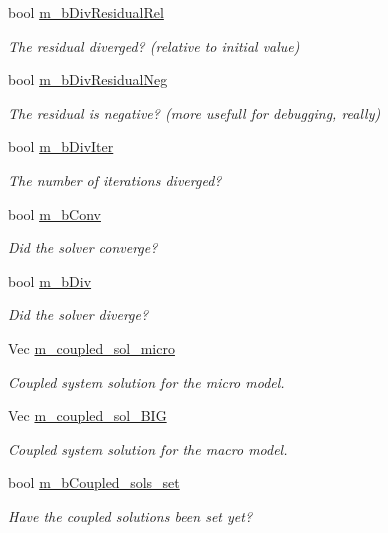 \begin{DoxyCompactItemize}
bool \hyperlink{classcarl_1_1_f_e_t_i___operations_a458f022e3ad766fadeab7746ef60f117}{m\+\_\+b\+Div\+Residual\+Rel}
\begin{DoxyCompactList}\small\item\em The residual diverged? (relative to initial value) \end{DoxyCompactList}\item 
bool \hyperlink{classcarl_1_1_f_e_t_i___operations_a343191e25b52e6913b686039fb5bd318}{m\+\_\+b\+Div\+Residual\+Neg}
\begin{DoxyCompactList}\small\item\em The residual is negative? (more usefull for debugging, really) \end{DoxyCompactList}\item 
bool \hyperlink{classcarl_1_1_f_e_t_i___operations_a7b94d72a58cd40af15151c28147ceb96}{m\+\_\+b\+Div\+Iter}
\begin{DoxyCompactList}\small\item\em The number of iterations diverged? \end{DoxyCompactList}\item 
bool \hyperlink{classcarl_1_1_f_e_t_i___operations_a4e8e38670cc41dc8de9e9465eda687ba}{m\+\_\+b\+Conv}
\begin{DoxyCompactList}\small\item\em Did the solver converge? \end{DoxyCompactList}\item 
bool \hyperlink{classcarl_1_1_f_e_t_i___operations_a8f5c0b81912f20a3e5768b0da392e039}{m\+\_\+b\+Div}
\begin{DoxyCompactList}\small\item\em Did the solver diverge? \end{DoxyCompactList}\item 
Vec \hyperlink{classcarl_1_1_f_e_t_i___operations_ad1760c083bd94bd64b0137098fe59fa8}{m\+\_\+coupled\+\_\+sol\+\_\+micro}
\begin{DoxyCompactList}\small\item\em Coupled system solution for the micro model. \end{DoxyCompactList}\item 
Vec \hyperlink{classcarl_1_1_f_e_t_i___operations_a1eb91fcecaa912934efd6e983a4461a1}{m\+\_\+coupled\+\_\+sol\+\_\+\+B\+I\+G}
\begin{DoxyCompactList}\small\item\em Coupled system solution for the macro model. \end{DoxyCompactList}\item 
bool \hyperlink{classcarl_1_1_f_e_t_i___operations_a3e44ca0d45ad91bbd792aaa3fa9f91be}{m\+\_\+b\+Coupled\+\_\+sols\+\_\+set}
\begin{DoxyCompactList}\small\item\em Have the coupled solutions been set yet? \end{DoxyCompactList}\end{DoxyCompactItemize}


